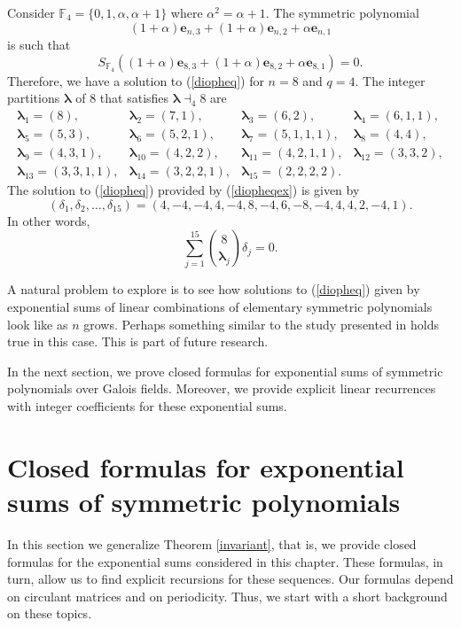 \begin{example}
 Consider $\mathbb{F}_4=\{0,1,\alpha,\alpha+1\}$ where $\alpha^2=\alpha+1$.  The symmetric polynomial 
 $$(1+\alpha)\boldsymbol{e}_{n,3}+(1+\alpha)\boldsymbol{e}_{n,2}+\alpha\boldsymbol{e}_{n,1}$$
 is such that
\begin{equation}
\label{diopheqex}
S_{\mathbb{F}_4}\left((1+\alpha)\boldsymbol{e}_{8,3}+(1+\alpha)\boldsymbol{e}_{8,2}+\alpha\boldsymbol{e}_{8,1}\right)=0.
\end{equation}
Therefore, we have a solution to (\ref{diopheq}) for $n=8$ and $q=4$.  The integer partitions $\boldsymbol{\lambda}$  of $8$ that satisfies $\boldsymbol{\lambda}\dashv_4 8$ are
$$ \begin{array}{llll}
 \boldsymbol{\lambda}_1=(8), &  \boldsymbol{\lambda}_2=(7, 1), & \boldsymbol{\lambda}_3= (6, 2), & \boldsymbol{\lambda}_4=(6, 1, 1),\\
 \boldsymbol{\lambda}_5=(5, 3),& \boldsymbol{\lambda}_6=(5, 2, 1), & \boldsymbol{\lambda}_7=(5, 1, 1, 1),& \boldsymbol{\lambda}_8= (4, 4),\\
 \boldsymbol{\lambda}_9=(4, 3, 1),& \boldsymbol{\lambda}_{10}= (4, 2, 2),& \boldsymbol{\lambda}_{11}= (4, 2, 1, 1),& \boldsymbol{\lambda}_{12}= (3, 3, 2),\\
 \boldsymbol{\lambda}_{13}=(3, 3, 1, 1),& \boldsymbol{\lambda}_{14}=(3,2, 2, 1),& \boldsymbol{\lambda}_{15}=(2, 2, 2, 2). & 
 \end{array}
$$
The solution to (\ref{diopheq}) provided by (\ref{diopheqex}) is given by
$$
(\delta_1,\delta_2,\ldots,\delta_{15})=(4, -4, -4, 4, -4, 8, -4, 6, -8, -4, 4, 4, 2, -4, 1).
$$
In other words,
$$\sum_{j=1}^{15} \binom{8}{\boldsymbol{\lambda}_j} \delta_j=0.$$
\end{example}
A natural problem to explore is to see how solutions to (\ref{diopheq}) given by exponential sums of linear combinations of elementary symmetric polynomials look like as $n$ grows.  Perhaps something similar to 
the study presented in \cite{cgm3} holds true in this case.  This is part of future research.


In the next section, we prove closed formulas for exponential sums of symmetric polynomials
over Galois fields.  Moreover, we provide explicit linear recurrences with integer coefficients for these exponential sums.


\section{Closed formulas for exponential sums of symmetric polynomials}
\label{closedformulas}
In this section we generalize Theorem \ref{invariant}, that is, we provide closed formulas for the exponential sums considered in this chapter.  These formulas, in turn, allow us to find explicit recursions for these sequences.  Our formulas depend on circulant matrices and on periodicity.  Thus, we start with a short background on these topics.

